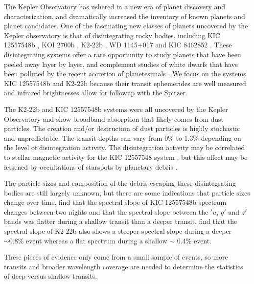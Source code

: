 \documentclass[letterpaper,12pt]{article}
\begin{document}
The Kepler Observatory has ushered in a new era of planet discovery and characterization, and dramatically increased the inventory of known planets and planet candidates.
One of the fascinating new classes of planets uncovered by the Kepler observatory is that of disintegrating rocky bodies,
including KIC 12557548b \citep{rappaport}, KOI 2700b \citep{rappaport2014KOI2700}, K2-22b \citep{sanchis-ojedak2-22}, WD 1145+017 \citep{vanderburg2015wdDisintegrating} and KIC 8462852 \citep{boyajian846}.
These disintegrating systems offer a rare opportunity to study planets that have been peeled away layer by layer, and complement studies of white dwarfs that have been polluted by the recent accretion of planetesimals \cite[e.g.][]{jura2003wdPollution}.
We focus on the systems KIC 12557548b and K2-22b because their transit ephemerides are well measured and infrared brightnesses allow for followup with the Spitzer.

The K2-22b and KIC 12557548b systems were all uncovered by the Kepler Observatory \citep{borucki2010} and show broadband absorption that likely comes from dust particles.
The creation and/or destruction of dust particles is highly stochastic and unpredictable.
The transit depths can vary from 0\% to 1.3\% depending on the level of disintegration activity.
The disintegration activity may be correlated to stellar magnetic activity for the KIC 12557548 system \citep{kawahara2013starspots}, but this affect may be lessened by occultations of starspots by planetary debris \citep{croll2015starspots}.

The particle sizes and composition of the debris escaping these disintegrating bodies are still largely unknown, but there are some indications that particle sizes change over time.
\citet{bochinski2015evolving} find that the spectral slope of KIC 12557548b spectrum changes between two nights and that the spectral slope between the $'u$, $g'$ and $z'$ bands was flatter during a shallow transit than a deeper transit. 
\cite{sanchis-ojedak2-22} find that the spectral slope of K2-22b also shows a steeper spectral slope during a deeper $\sim 0.8\%$ event whereas a flat spectrum during a shallow $\sim$ 0.4\% event.

These pieces of evidence only come from a small sample of events, so more transits and broader wavelength coverage are needed to determine the statistics of deep versus shallow transits.

\end{document}
